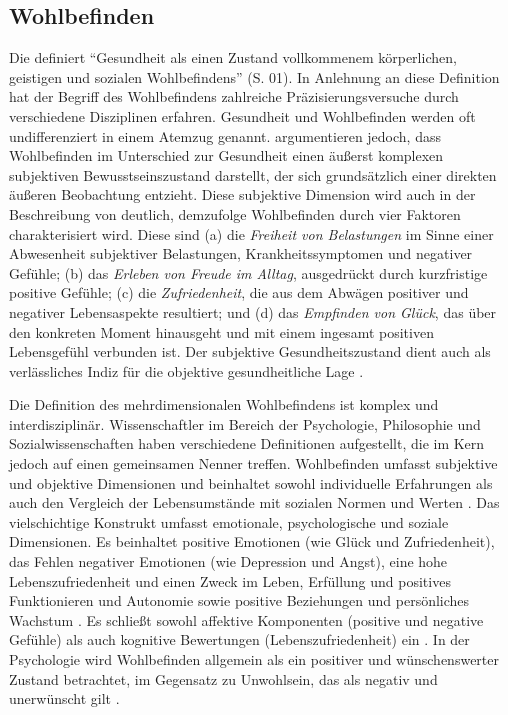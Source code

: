 \subsection{Wohlbefinden}   \label{subsec_2.1.3}
Die \textcite{WHO1948} definiert \enquote {Gesundheit als einen Zustand vollkommenem körperlichen, geistigen und sozialen Wohlbefindens} (S. 01). In Anlehnung an diese Definition hat der Begriff des Wohlbefindens zahlreiche Präzisierungsversuche durch verschiedene Disziplinen erfahren. Gesundheit und Wohlbefinden werden oft undifferenziert in einem Atemzug genannt. \textcite{TrojanLegewie2001} argumentieren jedoch, dass Wohlbefinden im Unterschied zur Gesundheit einen äußerst komplexen subjektiven Bewusstseinszustand darstellt, der sich grundsätzlich einer direkten äußeren Beobachtung entzieht. Diese subjektive Dimension wird auch in der Beschreibung von \textcite{Mayring1991} deutlich, demzufolge Wohlbefinden durch vier Faktoren charakterisiert wird. Diese sind (a) die \textit{Freiheit von Belastungen} im Sinne einer Abwesenheit subjektiver Belastungen, Krankheitssymptomen und negativer Gefühle; (b) das \textit{Erleben von Freude im Alltag}, ausgedrückt durch kurzfristige positive Gefühle; (c) die \textit{Zufriedenheit}, die aus dem Abwägen positiver und negativer Lebensaspekte resultiert; und (d) das \textit{Empfinden von Glück}, das über den konkreten Moment hinausgeht und mit einem ingesamt positiven Lebensgefühl verbunden ist. Der subjektive Gesundheitszustand dient auch als verlässliches Indiz für die objektive gesundheitliche Lage \parencite{Hornberg2016}.

Die Definition des mehrdimensionalen Wohlbefindens ist komplex und interdisziplinär. Wissenschaftler im Bereich der Psychologie, Philosophie und Sozialwissenschaften haben verschiedene Definitionen aufgestellt, die im Kern jedoch auf einen gemeinsamen Nenner treffen. Wohlbefinden umfasst subjektive und objektive Dimensionen und beinhaltet sowohl individuelle Erfahrungen als auch den Vergleich der Lebensumstände mit sozialen Normen und Werten  \parencite{DhanabhakyamSarath2023, Röhrle2023}. Das vielschichtige Konstrukt umfasst emotionale, psychologische und soziale Dimensionen. Es beinhaltet positive Emotionen (wie Glück und Zufriedenheit), das Fehlen negativer Emotionen (wie Depression und Angst), eine hohe Lebenszufriedenheit und einen Zweck im Leben, Erfüllung und positives Funktionieren und Autonomie sowie positive Beziehungen und persönliches Wachstum \parencite{PhilippEtAl2020, DhanabhakyamSarath2023}. Es schließt sowohl affektive Komponenten (positive und negative Gefühle) als auch kognitive Bewertungen (Lebenszufriedenheit) ein \parencite{DienerEtAl1999, NelsonEtAl2014}. In der Psychologie wird Wohlbefinden allgemein als ein positiver und wünschenswerter Zustand betrachtet, im Gegensatz zu Unwohlsein, das als negativ und unerwünscht gilt \parencite{Lucas2016}. 

